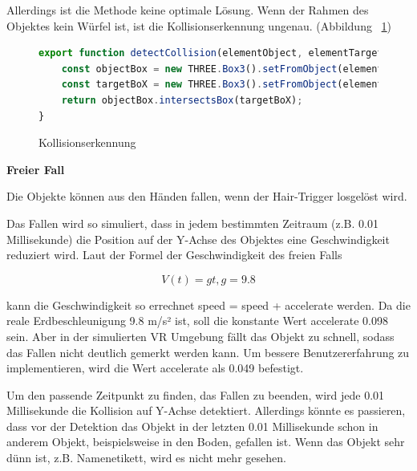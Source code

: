   Allerdings ist die Methode keine optimale Lösung. Wenn der Rahmen des Objektes kein Würfel ist, ist die Kollisionserkennung ungenau. (Abbildung ~\ref{fig:collisionDetection})
  
\begin{figure}[ht]
\vspace*{1em}
\centering
\caption[Kollisionserkennung]{Kollisionserkennung}
\begin{lstlisting}[language=JavaScript, style=htmlcssjs]
export function detectCollision(elementObject, elementTarget) {
    const objectBox = new THREE.Box3().setFromObject(elementObject.object3D);
    const targetBoX = new THREE.Box3().setFromObject(elementTarget.object3D);
    return objectBox.intersectsBox(targetBoX);
}
\end{lstlisting}
\label{fig:collisionDetection} 
\end{figure}
  
  \vspace{1em}
  \noindent
  \textbf{Freier Fall}
  \vspace{1em}
  
  \noindent
  Die Objekte können aus den Händen fallen, wenn der Hair-Trigger losgelöst wird.
  
  Das Fallen wird so simuliert, dass in jedem bestimmten Zeitraum (z.B. 0.01 Millisekunde) die Position auf der Y-Achse des Objektes eine Geschwindigkeit reduziert wird. Laut der Formel der Geschwindigkeit des freien Falls 
  
  \[ V(t) = gt, g = 9.8 \]
  
  \noindent
  kann die Geschwindigkeit so errechnet {\selectfont speed = speed + accelerate} werden.
  Da die reale Erdbeschleunigung 9.8 m/s² ist, soll die konstante Wert {\selectfont accelerate} 0.098 sein. Aber in der simulierten VR Umgebung fällt das Objekt zu schnell, sodass das Fallen nicht deutlich gemerkt werden kann. Um bessere Benutzererfahrung zu implementieren, wird die Wert {\selectfont accelerate} als 0.049 befestigt.
  
  Um den passende Zeitpunkt zu finden, das Fallen zu beenden, wird jede 0.01 Millisekunde die Kollision auf Y-Achse detektiert. Allerdings könnte es passieren, dass vor der Detektion das Objekt in der letzten 0.01 Millisekunde schon in anderem Objekt, beispielsweise in den Boden, gefallen ist. Wenn das Objekt sehr dünn ist, z.B. Namenetikett, wird es nicht mehr gesehen.
  
